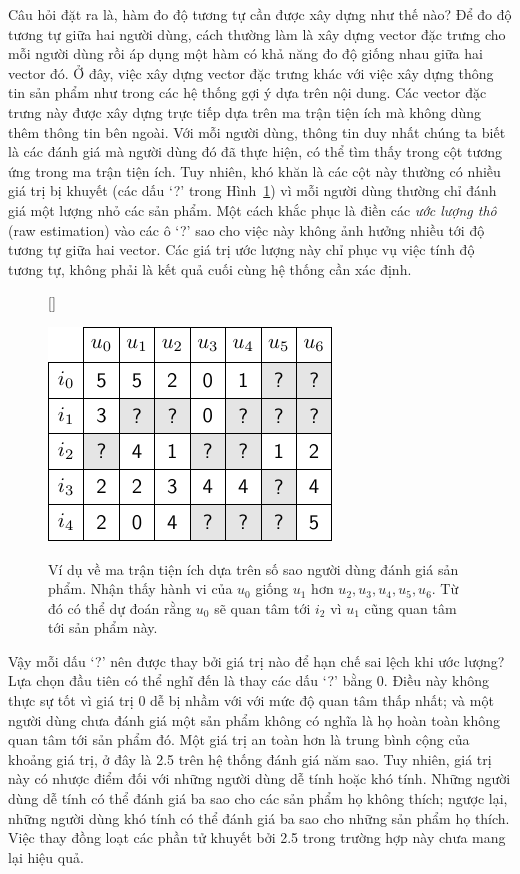 Câu hỏi đặt ra là, hàm đo độ tương tự cần được xây dựng như thế nào? Để đo độ
tương tự giữa hai người dùng, cách thường làm là xây dựng vector đặc trưng cho
mỗi người dùng rồi áp dụng một hàm có khả năng đo độ giống nhau giữa hai vector
đó. Ở đây, việc xây dựng vector đặc trưng khác với việc xây dựng thông tin sản
phẩm như trong các hệ thống gợi ý dựa trên nội dung. Các vector đặc trưng này
được xây dựng trực tiếp dựa trên ma trận tiện ích mà không dùng thêm thông tin
bên ngoài. Với mỗi người dùng, thông tin duy nhất chúng ta biết là các đánh giá
mà người dùng đó đã thực hiện, có thể tìm thấy trong cột tương ứng trong ma trận
tiện ích. Tuy nhiên, khó khăn là các cột này thường có nhiều giá trị bị khuyết
(các dấu `?' trong Hình~\ref{fig:24_1}) vì mỗi người dùng thường chỉ đánh giá
một lượng nhỏ các sản phẩm. Một cách khắc phục là điền các \textit{ước lượng
thô} (raw estimation) vào các ô `?' sao cho việc này không ảnh hưởng nhiều tới
{độ tương tự} giữa hai vector. Các giá trị ước lượng này chỉ phục vụ việc tính độ
tương tự, không phải là kết quả cuối cùng hệ thống cần xác định.
\begin{figure}[t]
[\FBwidth]
{\caption{
Ví dụ về ma trận tiện ích dựa trên số sao người dùng đánh giá
sản phẩm. Nhận thấy {hành vi} của $u_0$ giống $u_1$ hơn $u_2, u_3, u_4, u_5, u_6$. Từ đó có thể dự đoán rằng $u_0$ sẽ quan tâm tới $i_2$ vì $u_1$ cũng quan tâm tới sản phẩm này.
}
\label{fig:24_1}}
{ %
\includegraphics[width=.45\textwidth]{Chapters/06_RecommendationSystems/24_collaborativefiltering/latex/utility.pdf}
}
\end{figure}

Vậy mỗi dấu `?' nên được thay bởi giá trị nào để hạn chế sai lệch khi ước lượng? Lựa chọn đầu tiên có thể nghĩ đến là thay các dấu `?' bằng 0. Điều
này không thực sự tốt vì giá trị 0 dễ bị nhầm với với mức độ quan tâm thấp nhất; và
một người dùng chưa đánh giá một sản phẩm không có nghĩa là họ hoàn toàn không
quan tâm tới sản phẩm đó. Một giá trị {an toàn} hơn là trung bình cộng của khoảng giá trị, ở đây là 2.5 trên hệ thống đánh giá năm sao. Tuy nhiên, giá trị này có
nhược điểm đối với những người dùng {dễ tính} hoặc {khó tính}. Những
người dùng dễ tính có thể đánh giá ba sao cho các sản phẩm họ không thích;
ngược lại, những người dùng khó tính có thể đánh giá ba sao cho
những sản phẩm họ thích. Việc thay đồng loạt các phần tử khuyết bởi 2.5 trong
trường hợp này chưa mang lại hiệu quả.

